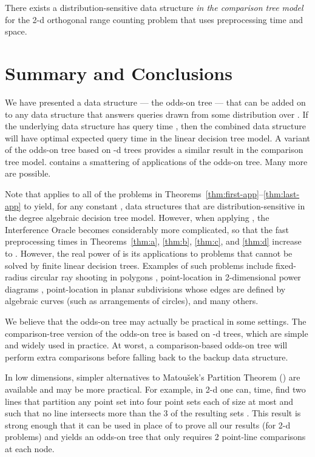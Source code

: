 \documentclass{patmorin}
\begin{document}
\begin{thm}
  There exists a distribution-sensitive data structure \emph{in the
  comparison tree model} for the 2-d orthogonal range counting problem
  that uses  preprocessing time and space.
\end{thm}

\section{Summary and Conclusions}

We have presented a data structure --- the odds-on tree --- that can
be added on to any data structure that answers queries drawn from some
distribution  over .  If the underlying data structure has query
time , then the combined data structure will have optimal
expected query time in the linear decision tree model.  A variant of
the odds-on tree based on -d trees provides a similar result in the
comparison tree model.   contains a smattering of
applications of the odds-on tree.  Many more are possible.

Note that  applies to all of the problems
in Theorems~\ref{thm:first-app}--\ref{thm:last-app} to yield, for
any constant , data structures that are distribution-sensitive
in the degree  algebraic decision tree model.  However, when
applying , the Interference Oracle becomes
considerably more complicated, so that the fast preprocessing times in
Theorems~\ref{thm:a}, \ref{thm:b}, \ref{thm:c}, and \ref{thm:d} increase
to .
However, the real power of  is its applications
to problems that cannot be solved by finite linear decision trees.
Examples of such problems include fixed-radius circular ray shooting in
polygons \cite{cceo04}, point-location in 2-dimensional power diagrams
\cite{a87}, point-location in planar subdivisions whose edges are defined
by algebraic curves (such as arrangements of circles), and many others.

We believe that the odds-on tree may actually be practical in some
settings.  The comparison-tree version of the odds-on tree is based on
-d trees, which are simple and widely used in practice. At worst,
a comparison-based odds-on tree will perform  extra
comparisons before falling back to the backup data structure.

In low dimensions, simpler alternatives to Matou\v{s}ek's Partition
Theorem () are available and may be more
practical.  For example, in 2-d one can,  time, find two lines
that partition any  point set into four point sets each of size at
most  and such that no line intersects more than the 3 of
the resulting sets \cite{m85}. This result is strong enough that it can
be used in place of  to prove all our results
(for 2-d problems) and yields an odds-on tree that only requires 2
point-line comparisons at each node.
\end{document}
